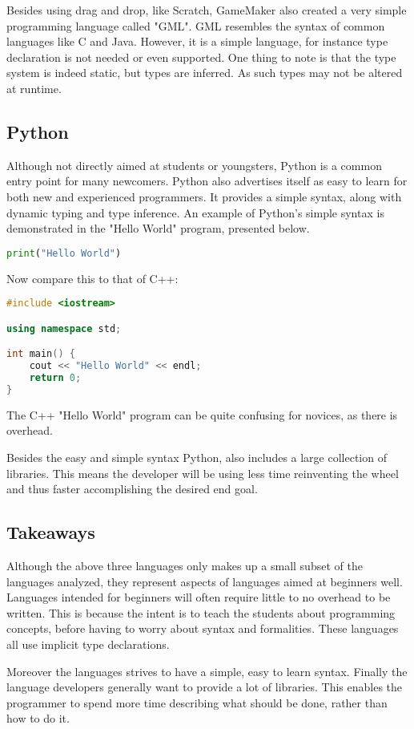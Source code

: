 Besides using drag and drop, like Scratch, GameMaker also created a very simple programming language called "GML".
GML resembles the syntax of common languages like C and Java. 
However, it is a simple language, for instance type declaration is not needed or even supported.
One thing to note is that the type system is indeed static, but types are inferred. 
As such types may not be altered at runtime\cite{GML}.

\subsection{Python}
Although not directly aimed at students or youngsters, Python is a common entry point for many newcomers. 
Python also advertises itself as easy to learn for both new and experienced programmers. 
It provides a simple syntax, along with dynamic typing and type inference\cite{PythonWebsite}.
An example of Python's simple syntax is demonstrated in the "Hello World" program, presented below.

\begin{lstlisting}[language=Python,label=lis:PythonHelloWorld,caption=Hello World in python]
print("Hello World")
\end{lstlisting}

Now compare this to that of C++:

\begin{lstlisting}[language=C++,label=lis:C++HelloWorld,caption=Hello World in C++]
#include <iostream>

using namespace std;

int main() {
	cout << "Hello World" << endl;
	return 0;
}
\end{lstlisting}

The C++ "Hello World" program can be quite confusing for novices, as there is overhead.

Besides the easy and simple syntax Python, also includes a large collection of libraries\cite{PythonLibraries}.
This means the developer will be using less time reinventing the wheel and thus faster accomplishing the desired end goal\cite{PythonXKCD}.

\subsection{Takeaways}
Although the above three languages only makes up a small subset of the languages analyzed, they represent aspects of languages aimed at beginners well.
Languages intended for beginners will often require little to no overhead to be written. 
This is because the intent is to teach the students about programming concepts, before having to worry about syntax and formalities. 
These languages all use implicit type declarations.

Moreover the languages strives to have a simple, easy to learn syntax. 
Finally the language developers generally want to provide a lot of libraries. 
This enables the programmer to spend more time describing what should be done, rather than how to do it.
